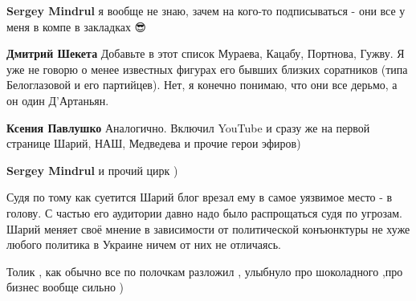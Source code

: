 \begin{itemize}
\begin{itemize}
\textbf{Sergey Mindrul} я вообще не знаю, зачем на кого-то подписываться - они все у меня в компе в закладках 😎

 
\textbf{Дмитрий Шекета} Добавьте в этот список Мураева, Кацабу, Портнова, Гужву. Я уже не говорю о менее известных фигурах его бывших близких соратников (типа Белоглазовой и его партийцев). Нет, я конечно понимаю, что они все дерьмо, а он один Д’Артаньян.

 
\textbf{Ксения Павлушко} Аналогично. Включил YouTube и сразу же на первой странице Шарий, НАШ, Медведева и прочие герои эфиров)

 
\textbf{Sergey Mindrul} и прочий цирк )
\end{itemize}

 

Судя по тому как суетится Шарий блог врезал ему в самое уязвимое место - в
голову. С частью его аудитории давно надо было распрощаться судя по
угрозам. Шарий меняет своё мнение в зависимости от политической конъюнктуры не
хуже любого политика в Украине ничем от них не отличаясь.


 
Толик , как обычно все по полочкам разложил , улыбнуло про шоколадного ,про бизнес вообще сильно )


\end{itemize}
